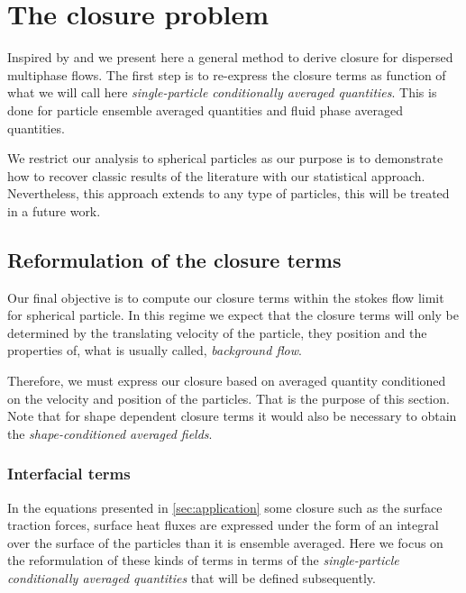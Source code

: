\section{The closure problem}
\label{ap:Closure_problem}

Inspired by \cite{hinch1977averaged} and \cite{zhang1994ensemble} we present here a general method to derive closure for dispersed multiphase flows. 
The first step is to re-express the closure terms as function of what we will call here \textit{single-particle conditionally averaged quantities}. 
This is done for particle ensemble averaged quantities and fluid phase averaged quantities. 

We restrict our analysis to spherical particles as our purpose is to demonstrate how to recover classic results of the literature with our statistical approach. 
Nevertheless, this approach extends to any type of particles, this will be treated in a future work. 

\subsection{Reformulation of the closure terms}

Our final objective is to compute our closure terms within the stokes flow limit for spherical particle.
In this regime we expect that  the closure terms will only be determined by the translating velocity of the particle, they position and the properties of, what is usually called, \textit{background flow}. 


Therefore, we must express our closure based on averaged quantity conditioned on the velocity and position of the particles. 
That is the purpose of this section. 
Note that for shape dependent closure terms it would also be necessary to obtain the \textit{shape-conditioned averaged fields}. 

\subsubsection{Interfacial terms}

In the equations presented in \ref{sec:application} some closure such as the surface traction forces, surface heat fluxes are expressed under the form of an integral over the surface of the particles than it is ensemble averaged. 
Here we focus on the reformulation of these kinds of terms in terms of the \textit{single-particle conditionally averaged quantities} that will be defined subsequently.

